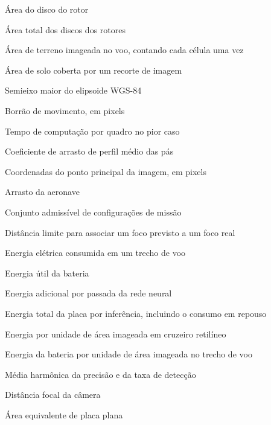 \begin{simbolos}
  \setlength{\itemsep}{2pt}
  \item[$A$]                       Área do disco do rotor
  \item[$A_{\Sigma}$]              Área total dos discos dos rotores
  \item[$A_{\mathrm{img}}$] Área de terreno imageada no voo, contando cada célula uma vez
  \item[$A_t$]                     Área de solo coberta por um recorte de imagem
  \item[$a$]                       Semieixo maior do elipsoide WGS-84
  \item[$b$]                       Borrão de movimento, em pixels
  \item[$C$]                       Tempo de computação por quadro no pior caso
  \item[$C_{d0}$]                  Coeficiente de arrasto de perfil médio das pás
  \item[$c_x, c_y$]                Coordenadas do ponto principal da imagem, em pixels
  \item[$D$]                       Arrasto da aeronave
  \item[$\mathcal{D}$] Conjunto admissível de configurações de missão
  \item[$d_{\max}$]                Distância limite para associar um foco previsto a um foco real
  \item[$E$]                       Energia elétrica consumida em um trecho de voo
  \item[$E_b$]                     Energia útil da bateria
  \item[$E_{\mathrm{inf}}$]        Energia adicional por passada da rede neural
  \item[$E_{\mathrm{total}}$] Energia total da placa por inferência, incluindo o consumo em repouso
  \item[$e$]                       Energia por unidade de área imageada em cruzeiro retilíneo
  \item[$e_{\mathrm{voo}}$] Energia da bateria por unidade de área imageada no trecho de voo
  \item[$F_1$] Média harmônica da precisão e da taxa de detecção
  \item[$f_c$]                     Distância focal da câmera
  \item[$f_e$]                     Área equivalente de placa plana

\end{simbolos}
